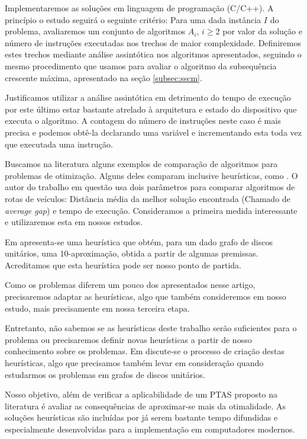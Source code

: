 Implementaremos as soluções em linguagem de programação (C/C++). A princípio o estudo seguirá o seguinte critério: Para uma dada instância $I$ do problema, avaliaremos um conjunto de algoritmos $A_i$, $i \geq 2$ por valor da solução e número de instruções executadas nos trechos de maior complexidade. Definiremos estes trechos mediante análise assintótica nos algoritmos apresentados, seguindo o mesmo procedimento que usamos para avaliar o algoritmo da subsequência crescente máxima, apresentado na seção \ref{subsec:sscm}.

Justificamos utilizar a análise assintótica em detrimento do tempo de execução por este último estar bastante atrelado à arquitetura e estado do dispositivo que executa o algoritmo. A contagem do número de instruções neste caso é mais precisa e podemos obtê-la declarando uma variável e incrementando esta toda vez que executada uma instrução.

Buscamos na literatura alguns exemplos de comparação de algoritmos para problemas de otimização. Alguns deles comparam inclusive heurísticas, como \cite{ropke2005heuristic}. O autor do trabalho em questão usa dois parâmetros para comparar algoritmos de rotas de veículos: Distância média da melhor solução encontrada (Chamado de \textit{average gap}) e tempo de execução. Consideramos a primeira medida interessante e utilizaremos esta em nossos estudos.

Em \cite{marathe1995simple} apresenta-se uma heurística que obtém, para um dado grafo de discos unitários, uma 10-aproximação, obtida a partir de algumas premissas. Acreditamos que esta heurística pode ser nosso ponto de partida.

Como os problemas diferem um pouco dos apresentados nesse artigo, precisaremos adaptar as heurísticas, algo que também consideremos em nosso estudo, mais precisamente em nossa terceira etapa.

Entretanto, não sabemos se as heurísticas deste trabalho serão suficientes para o problema ou precisaremos definir novas heurísticas a partir de nosso conhecimento sobre os problemas. Em \cite{lenat} discute-se o processo de criação destas heurísticas, algo que precisamos também levar em consideração quando estudarmos os problemas em grafos de discos unitários.

Nosso objetivo, além de verificar a aplicabilidade de um PTAS proposto na literatura é avaliar as consequências de aproximar-se mais da otimalidade. As soluções heurísticas são incluídas por já serem bastante tempo difundidas e especialmente desenvolvidas para a implementação em computadores modernos.

